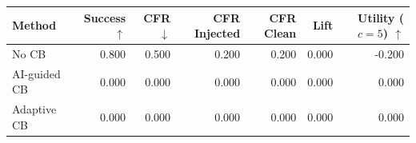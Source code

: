 \begin{tabular}{lrrrrrr}
\toprule
Method & Success $\uparrow$ & CFR $\downarrow$ & CFR Injected & CFR Clean & Lift & Utility ($c=5$) $\uparrow$ \\
\midrule
No CB & 0.800 & 0.500 & 0.200 & 0.200 & 0.000 & -0.200 \\
AI-guided CB & 0.000 & 0.000 & 0.000 & 0.000 & 0.000 & 0.000 \\
Adaptive CB & 0.000 & 0.000 & 0.000 & 0.000 & 0.000 & 0.000 \\
\bottomrule
\end{tabular}
